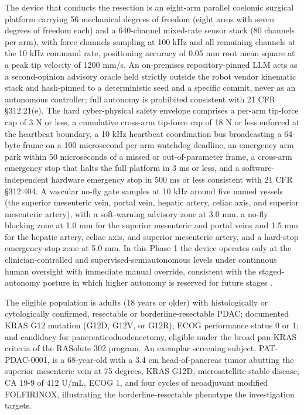 The device that conducts the resection is an eight-arm parallel coelomic surgical
platform carrying 56 mechanical degrees of freedom (eight arms with seven
degrees of freedom each) and a 640-channel mixed-rate sensor stack (80 channels per
arm), with force channels sampling at 100 kHz and all remaining channels at the
10 kHz command rate, positioning accuracy of 0.05 mm root mean square at a peak tip
velocity of 1200 mm/s. An on-premises repository-pinned LLM acts as a second-opinion
advisory oracle held strictly outside the robot vendor kinematic stack and hash-pinned
to a deterministic seed and a specific commit, never as an autonomous controller;
full autonomy is prohibited consistent with 21 CFR \S 312.21(e). The hard
cyber-physical safety envelope comprises a per-arm tip-force cap of 3 N or less, a
cumulative cross-arm tip-force cap of 18 N or less enforced at the heartbeat
boundary, a 10 kHz heartbeat coordination bus broadcasting a 64-byte frame on a 100
microsecond per-arm watchdog deadline, an emergency arm park within 50 microseconds
of a missed or out-of-parameter frame, a cross-arm emergency stop that halts the
full platform in 3 ms or less, and a software-independent hardware emergency stop in
500 ms or less consistent with 21 CFR \S 312.404. A vascular no-fly gate samples at
10 kHz around five named vessels (the superior mesenteric vein, portal vein, hepatic
artery, celiac axis, and superior mesenteric artery), with a soft-warning advisory
zone at 3.0 mm, a no-fly blocking zone at 1.0 mm for the superior mesenteric and
portal veins and 1.5 mm for the hepatic artery, celiac axis, and superior mesenteric
artery, and a hard-stop emergency-stop zone at 5.0 mm. In this Phase 1 the device
operates only at the clinician-controlled and supervised-semiautonomous levels under
continuous human oversight with immediate manual override, consistent with the
staged-autonomy posture in which higher autonomy is reserved for future stages
\cite{daraxwhipple, onpremwhippl, clintrustpai}.

The eligible population is adults (18 years or older) with histologically or
cytologically confirmed, resectable or borderline-resectable PDAC; documented KRAS
G12 mutation (G12D, G12V, or G12R); ECOG performance status 0 or 1; and candidacy
for pancreaticoduodenectomy, eligible under the broad pan-KRAS criteria of the
RASolute 302 program. An exemplar screening subject, PAT-PDAC-0001, is a 68-year-old
with a 3.4 cm head-of-pancreas tumor abutting the superior mesenteric vein at 75
degrees, KRAS G12D, microsatellite-stable disease, CA 19-9 of 412 U/mL, ECOG 1, and
four cycles of neoadjuvant modified FOLFIRINOX, illustrating the borderline-resectable
phenotype the investigation targets.


